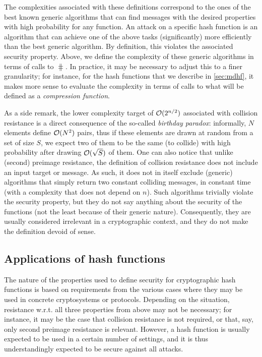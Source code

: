 The complexities associated with these definitions correspond to the ones of the best known generic algorithms that can find messages with the desired
properties with high probability for any function. An attack on a specific hash function is an algorithm that can achieve one of the above tasks (significantly)
more efficiently than the best generic algorithm. By definition, this violates the associated security property.
Above, we define the complexity of these generic algorithms in terms of calls to $\hash$. In practice, it may be necessary to adjust
this to a finer granularity; for instance, for the \merkdam hash functions that we describe in \autoref{sec:mdhf}, it makes more sense to evaluate the complexity
in terms of calls to what will be defined as a \emph{compression function}.

As a side remark, the lower complexity target of $\operatorname{\mathcal{O}}(2^{n/2})$ associated with collision resistance is a direct consequence of the so-called \emph{birthday paradox}: informally,
$N$ elements define $\operatorname{\mathcal{O}}(N^2)$ pairs, thus if these elements are drawn at random from a set of size $S$, we expect two of them to be the same (\ie to collide)
with high probability after drawing $\operatorname{\mathcal{O}}(\sqrt{S})$ of them.
One can also notice that unlike (second) preimage resistance, the definition of collision resistance does not include an input target or message. As such, it does not in itself
exclude (generic) algorithms that simply return two constant colliding messages, in constant time
(\ie with a complexity that does not depend on $n$). Such algorithms trivially violate the security property, but
they do not say anything about the security of the functions (not the least because of their generic nature). Consequently, they are usually considered irrelevant in a cryptographic context, and they do not make
the definition devoid of sense.

\subsection{Applications of hash functions}

The nature of the properties used to define security for cryptographic hash functions is based on requirements from the various cases where they may be used in concrete cryptosystems or protocols.
Depending on the situation, resistance w.r.t. all three properties from above may not be necessary; for instance, it may be the case that collision resistance is not required, or that, say, only second preimage resistance
is relevant. However, a hash function is usually expected to be used in a certain number of settings, and it is thus understandingly expected to be secure against all attacks.


